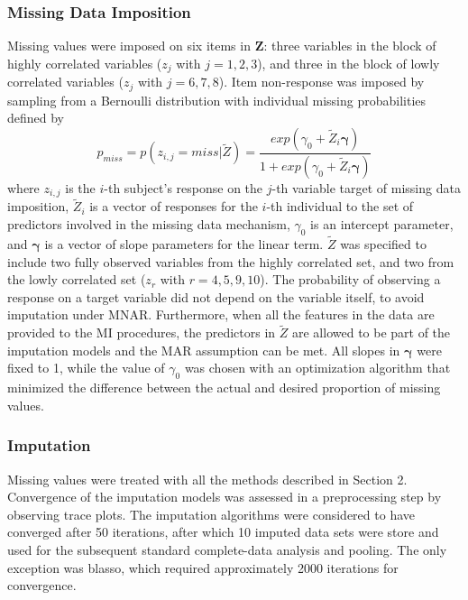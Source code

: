 \subsubsection{Missing Data Imposition} \label{sub_missing}

	Missing values were imposed on six items in $\bm{Z}$: three variables in the block of
	highly correlated variables ($z_j$ with $j = 1,2,3$), and three in the block of lowly correlated variables ($z_j$ 
	with $j = 6,7,8$).
	Item non-response was imposed by sampling from a Bernoulli distribution with individual missing probabilities 
	defined by 
%
	\begin{equation} \label{eqn:rm}
		p_{miss} = p(z_{i,j} = miss | \tilde{Z}) = \frac{ exp(\gamma_0 + \tilde{Z}_{i}\bm{\gamma}) }
								{ 1 + exp(\gamma_0 + \tilde{Z}_{i}\bm{\gamma}) }
	\end{equation}
%
	where $z_{i,j}$ is the $i$-th subject's response on the $j$-th variable target of missing data imposition, 
	$\tilde{Z}_{i}$ is a vector of responses for the $i$-th individual to the set of predictors involved in 
	the missing data mechanism, $\gamma_0$ is an intercept parameter, and $\bm{\gamma}$ is a vector of slope 
	parameters for the linear term.
	$\tilde{Z}$ was specified to include two fully observed variables from the highly correlated set, and two 
	from the lowly correlated set ($z_r$ with $r = 4,5,9,10$).
	The probability of observing a response on a target variable did not depend on the variable itself, 
	to avoid imputation under MNAR.
	Furthermore, when all the features in the data are provided to the MI procedures, the predictors in $\tilde{Z}$ 
	are allowed to be part of the imputation models and the MAR assumption can be met.
	All slopes in $\bm{\gamma}$ were fixed to 1, while the value of $\gamma_0$ was chosen with an optimization 
	algorithm that minimized the difference between the actual and desired proportion of missing values.

\subsubsection{Imputation}
	
	Missing values were treated with all the methods described in Section 2.
	Convergence of the imputation models was assessed in a preprocessing step by observing trace plots.
	The imputation algorithms were considered to have converged after 50 iterations, after which 10 imputed data 
	sets were store and used for the subsequent standard complete-data analysis and pooling.
	The only exception was blasso, which required approximately 2000 iterations for convergence.

